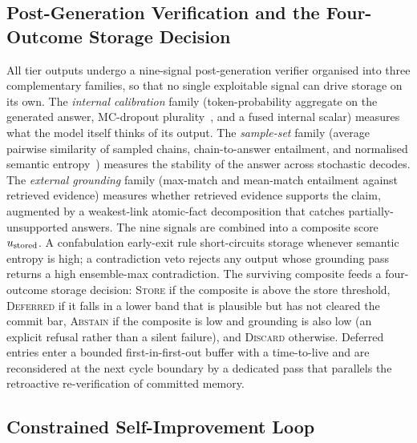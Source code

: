 \subsection{Post-Generation Verification and the Four-Outcome Storage Decision}

All tier outputs undergo a nine-signal post-generation verifier organised into three complementary families, so that no single exploitable signal can drive storage on its own. The \textit{internal calibration} family (token-probability aggregate on the generated answer, MC-dropout plurality~\cite{pmlr-v48-gal16}, and a fused internal scalar) measures what the model itself thinks of its output. The \textit{sample-set} family (average pairwise similarity of sampled chains, chain-to-answer entailment, and normalised semantic entropy~\cite{farquhar2024semantic}) measures the stability of the answer across stochastic decodes. The \textit{external grounding} family (max-match and mean-match entailment against retrieved evidence) measures whether retrieved evidence supports the claim, augmented by a weakest-link atomic-fact decomposition that catches partially-unsupported answers. The nine signals are combined into a composite score $u_{\text{stored}}$. A confabulation early-exit rule short-circuits storage whenever semantic entropy is high; a contradiction veto rejects any output whose grounding pass returns a high ensemble-max contradiction. The surviving composite feeds a four-outcome storage decision: \textsc{Store} if the composite is above the store threshold, \textsc{Deferred} if it falls in a lower band that is plausible but has not cleared the commit bar, \textsc{Abstain} if the composite is low and grounding is also low (an explicit refusal rather than a silent failure), and \textsc{Discard} otherwise. Deferred entries enter a bounded first-in-first-out buffer with a time-to-live and are reconsidered at the next cycle boundary by a dedicated pass that parallels the retroactive re-verification of committed memory.

\subsection{Constrained Self-Improvement Loop}

